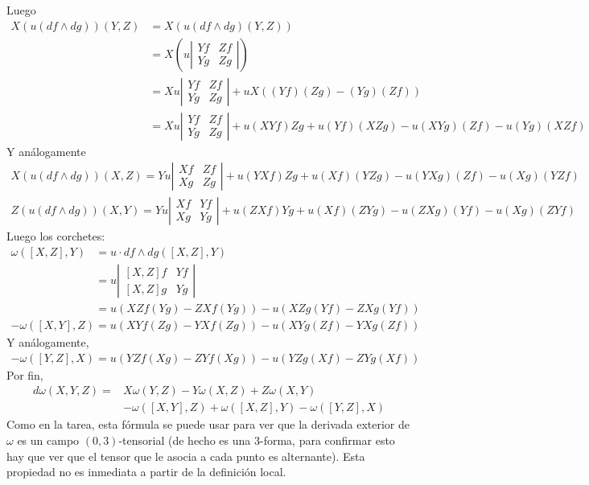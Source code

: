 \documentclass[spanish]{book}
\theoremstyle{definition}
\begin{document}
	Luego
	\begin{align*}
		X(u(df\wedge dg))(Y,Z)&=X(u(df\wedge dg)(Y,Z))\\
		&=X\left(u\left|\begin{matrix}
			Yf&Zf\\
			Yg&Zg
		\end{matrix}\right|\right)\\
		&=Xu\left|\begin{matrix}
			Yf&Zf\\
			Yg&Zg
		\end{matrix}\right|+uX((Yf)(Zg)-(Yg)(Zf))\\
		&=Xu\left|\begin{matrix}
			Yf&Zf\\
			Yg&Zg
		\end{matrix}\right|+u(XYf)Zg+u(Yf)(XZg)-u(XYg)(Zf)-u(Yg)(XZf)
	\end{align*}
	Y análogamente
	\begin{align*}
		X(u(df\wedge dg))(X,Z)=Yu\left|\begin{matrix}
			Xf&Zf\\
			Xg&Zg
		\end{matrix}\right|+u(YXf)Zg+u(Xf)(YZg)-u(YXg)(Zf)-u(Xg)(YZf)
	\end{align*}
	\begin{align*}
		Z(u(df\wedge dg))(X,Y)=Yu\left|\begin{matrix}
			Xf&Yf\\
			Xg&Yg
		\end{matrix}\right|+u(ZXf)Yg+u(Xf)(ZYg)-u(ZXg)(Yf)-u(Xg)(ZYf)
	\end{align*}
	Luego los corchetes:
	\begin{align*}
		\omega([X,Z],Y)&=u\cdot df\wedge dg([X,Z],Y)\\
		&=u\left|\begin{matrix}
			[X,Z]f&Yf\\
			[X,Z]g&Yg
		\end{matrix}\right|\\
		&=u(XZf(Yg)-ZXf(Yg))-u(XZg(Yf)-ZXg(Yf))
	\end{align*}
		\begin{align*}
		-\omega([X,Y],Z)=u(XYf(Zg)-YXf(Zg))-u(XYg(Zf)-YXg(Zf))
	\end{align*}
	Y análogamente,
		\begin{align*}
		-\omega([Y,Z],X)=u(YZf(Xg)-ZYf(Xg))-u(YZg(Xf)-ZYg(Xf))
	\end{align*}
	Por fin,
	\begin{align*}
		d\omega(X,Y,Z)=&X\omega(Y,Z)-Y\omega(X,Z)+Z\omega(X,Y)\\
		&-\omega([X,Y],Z)+\omega([X,Z],Y)-\omega([Y,Z],X)
	\end{align*}
	Como en la tarea, esta fórmula se puede usar para ver que la derivada exterior de $\omega$ es un campo $(0,3)$-tensorial (de hecho es una 3-forma, para confirmar esto hay que ver que el tensor que le asocia a cada punto es alternante). Esta propiedad no es inmediata a partir de la definición local.
	
\end{document}
